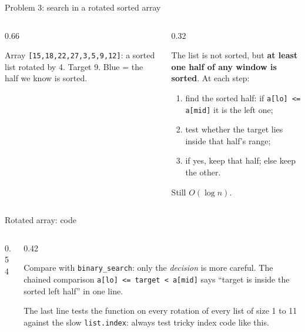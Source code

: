 \documentclass[aspectratio=169,10pt]{beamer}
\begin{document}
\begin{frame}{Problem 3: search in a rotated sorted array}
\begin{columns}[T]
\begin{column}{0.66\textwidth}
\begin{sfig}[0.7]
\begin{tikzpicture}
  
\end{tikzpicture}
\end{sfig}
\vspace{1mm}
{\small Array \texttt{[15,18,22,27,3,5,9,12]}: a sorted list rotated by 4. Target 9. Blue = the half we know is sorted.}
\end{column}
\begin{column}{0.32\textwidth}
{\small
The list is not sorted, but \textbf{at least one half of any window is sorted}. At each step:
\begin{enumerate}\setlength\itemsep{2pt}
\item find the sorted half: if \texttt{a[lo] <= a[mid]} it is the left one;
\item test whether the target lies inside that half's range;
\item if yes, keep that half; else keep the other.
\end{enumerate}
Still $O(\log n)$.}
\end{column}
\end{columns}
\end{frame}

\begin{frame}{Rotated array: code}
\begin{columns}[T]
\begin{column}{0.54\textwidth}
\end{column}
\begin{column}{0.42\textwidth}
\vspace{2mm}
{\small
Compare with \texttt{binary\_search}: only the \emph{decision} is more careful. The chained comparison \texttt{a[lo] <= target < a[mid]} says ``target is inside the sorted left half'' in one line.

\vspace{2mm}
The last line tests the function on every rotation of every list of size 1 to 11 against the slow \texttt{list.index}: always test tricky index code like this.}
\end{column}
\end{columns}
\end{frame}
\end{document}

